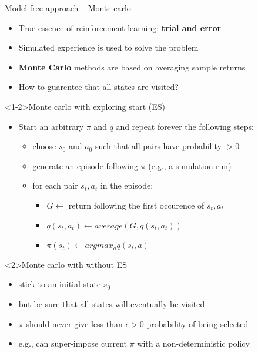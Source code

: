 \documentclass[presentation, 9pt]{beamer}\mode<presentation>{\usetheme{AMSBolognaFC}}
\begin{document}
\begin{frame}{Model-free approach -- Monte carlo}
	\begin{itemize}
		\item True essence of reinforcement learning: \textbf{trial and error}
		\item Simulated experience is used to solve the problem
		\item \textbf{Monte Carlo} methods are based on averaging sample returns
		\item How to guarentee that all states are visited?
	\end{itemize}
	\begin{alertblock}<1-2>{Monte carlo with exploring start (ES)}
		\begin{itemize}
			\item Start an arbitrary $\pi$ and $q$ and repeat forever the following steps:
			\begin{itemize}
				\item choose $s_0$ and $a_0$ such that all pairs have probability $> 0$
				\item generate an episode following $\pi$ (e.g., a simulation run)
				\item for each pair $s_t, a_t$ in the episode:
				\begin{itemize}
					\item $G \leftarrow$ return following the first occurence of $s_t, a_t$
					\item $q(s_t, a_t) \leftarrow average(G, q(s_t, a_t))$
					\item $\pi(s_t) \leftarrow argmax_a q(s_t, a)$
				\end{itemize}
			\end{itemize}
		\end{itemize}
	\end{alertblock}
	\begin{alertblock}{Monte carlo with without ES}
		\begin{itemize}
			\item stick to an initial state $s_0$ 
			\item but be sure that all states will eventually be visited
			\item $\pi$ should never give less than $\epsilon > 0$ probability of being selected
			\item e.g., can super-impose current $\pi$ with a non-deterministic policy
		\end{itemize}
	\end{alertblock}
\end{frame}
\end{document}
